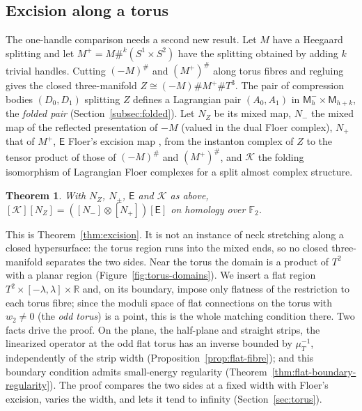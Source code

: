 \documentclass[11pt]{amsart}
\theoremstyle{definition}
\theoremstyle{remark}
\theoremstyle{plain}
\newtheorem{thmletter}{Theorem}
\numberwithin{equation}{section}
\newcommand{\RR}{\mathbb{R}}
\newcommand{\FF}{\mathbb{F}_2}
\newcommand{\Msf}{\mathsf{M}}
\begin{document}
\subsection{Excision along a torus}

The one-handle comparison needs a second new result. Let $M$ have a Heegaard
splitting and let $M^+=M\#^k(S^1\times S^2)$ have the splitting obtained by
adding $k$ trivial handles. Cutting $(-M)^\#$ and $(M^+)^\#$ along torus fibres and regluing gives the closed three-manifold $Z\cong(-M)\#M^+\#T^3$. The pair of compression bodies
$(D_0,D_1)$ splitting $Z$ defines a Lagrangian pair $(A_0,A_1)$ in $\Msf_h^-\times\Msf_{h+k}$,
the \emph{folded pair} (Section~\ref{subsec:folded}). Let $N_Z$ be its mixed map, $N_-$ the
mixed map of the reflected presentation of $-M$ (valued in the dual Floer complex), $N_+$
that of $M^+$, $\mathsf E$ Floer's excision map
\cite{BD, KM-sutures}, \cite[Theorem~5.6]{KM-unknot} from the instanton complex
of $Z$ to the tensor product of those of $(-M)^\#$ and $(M^+)^\#$, and $\mathcal K$ the
folding isomorphism of Lagrangian Floer complexes for a split almost complex
structure.

\begin{thmletter}\label{thm:C}
With $N_Z$, $N_\pm$, $\mathsf E$ and $\mathcal K$ as above,
$[\mathcal K][N_Z]=([N_-]\otimes[N_+])[\mathsf E]$ on homology over $\FF$.
\end{thmletter}

This is Theorem~\ref{thm:excision}. It is not an instance of neck stretching along a closed
hypersurface: the torus region runs into the mixed ends, so no closed three-manifold separates
the two sides. Near the torus the domain is a product of $T^2$ with a planar region
(Figure~\ref{fig:torus-domains}). We insert a flat region $T^2\times[-\lambda,\lambda]\times\RR$
and, on its boundary, impose only flatness of the restriction to each torus fibre; since the
moduli space of flat connections on the torus with $w_2\ne0$ (the \emph{odd torus}) is a
point, this is the whole matching condition there. Two
facts drive the proof. On the plane, the half-plane and straight strips, the linearized
operator at the odd flat torus has an inverse bounded by $\mu_T^{-1}$, independently of the
strip width (Proposition~\ref{prop:flat-fibre}); and this boundary condition admits
small-energy regularity (Theorem~\ref{thm:flat-boundary-regularity}). The proof compares the
two sides at a fixed width with Floer's excision, varies the width, and lets it tend to
infinity (Section~\ref{sec:torus}).
\end{document}
